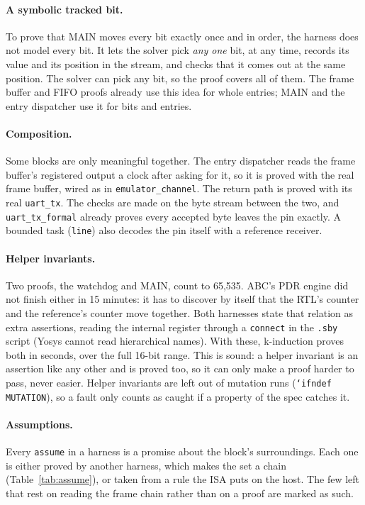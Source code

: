 \documentclass[11pt,a4paper]{article}
\newcommand{\sig}[1]{\texttt{#1}}
\begin{document}
\paragraph{A symbolic tracked bit.} To prove that MAIN moves every bit exactly once and in order, the harness does not model every bit. It lets the solver pick \emph{any one} bit, at any time, records its value and its position in the stream, and checks that it comes out at the same position. The solver can pick any bit, so the proof covers all of them. The frame buffer and FIFO proofs already use this idea for whole entries; MAIN and the entry dispatcher use it for bits and entries.

\paragraph{Composition.} Some blocks are only meaningful together. The entry dispatcher reads the frame buffer's registered output a clock after asking for it, so it is proved with the real frame buffer, wired as in \sig{emulator\_channel}. The return path is proved with its real \sig{uart\_tx}. The checks are made on the byte stream between the two, and \sig{uart\_tx\_formal} already proves every accepted byte leaves the pin exactly. A bounded task (\sig{line}) also decodes the pin itself with a reference receiver.

\paragraph{Helper invariants.} Two proofs, the watchdog and MAIN, count to 65,535. ABC's PDR engine did not finish either in 15 minutes: it has to discover by itself that the RTL's counter and the reference's counter move together. Both harnesses state that relation as extra assertions, reading the internal register through a \sig{connect} in the \sig{.sby} script (Yosys cannot read hierarchical names). With these, k-induction proves both in seconds, over the full 16-bit range. This is sound: a helper invariant is an assertion like any other and is proved too, so it can only make a proof harder to pass, never easier. Helper invariants are left out of mutation runs (\sig{`ifndef MUTATION}), so a fault only counts as caught if a property of the spec catches it.

\paragraph{Assumptions.} Every \sig{assume} in a harness is a promise about the block's surroundings. Each one is either proved by another harness, which makes the set a chain (Table~\ref{tab:assume}), or taken from a rule the ISA puts on the host. The few left that rest on reading the frame chain rather than on a proof are marked as such.
\end{document}
